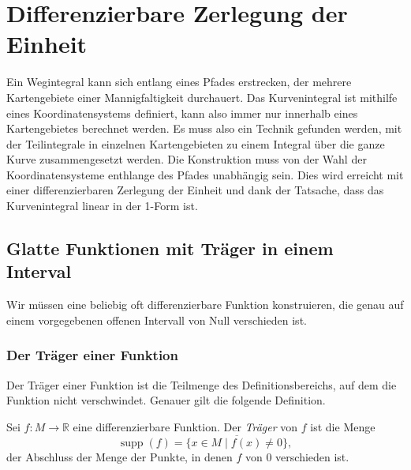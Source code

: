 %
%
\section{Differenzierbare Zerlegung der Einheit
\label{buch:kurvenintegral:section:zerlegung}}
%
Ein Wegintegral kann sich entlang eines Pfades erstrecken, der
mehrere Kartengebiete einer Mannigfaltigkeit durchauert.
Das Kurvenintegral ist mithilfe eines Koordinatensystems definiert,
kann also immer nur innerhalb eines Kartengebietes berechnet werden.
Es muss also ein Technik gefunden werden, mit der Teilintegrale in
einzelnen Kartengebieten zu einem Integral über die ganze Kurve
zusammengesetzt werden.
Die Konstruktion muss von der Wahl der Koordinatensysteme enthlange
des Pfades unabhängig sein.
Dies wird erreicht mit einer differenzierbaren Zerlegung der Einheit
und dank der Tatsache, dass das Kurvenintegral linear in der 1-Form
ist.

%
%
\subsection{Glatte Funktionen mit Träger in einem Interval}
Wir müssen eine beliebig oft differenzierbare Funktion konstruieren,
die genau auf einem vorgegebenen offenen Intervall von Null
verschieden ist.

%
%
\subsubsection{Der Träger einer Funktion}
Der Träger einer Funktion ist die Teilmenge des Definitionsbereichs,
auf dem die Funktion nicht verschwindet.
Genauer gilt die folgende Definition.

\begin{definition}
Sei $f\colon M\to\mathbb{R}$ eine differenzierbare Funktion.
Der \emph{Träger} von $f$ ist die Menge
%
%
\[
\operatorname{supp}(f)
=
\overline{
\{x\in M\mid f(x)\ne 0\}
},
\]
der Abschluss der Menge der Punkte, in denen $f$ von $0$ verschieden
ist.
\end{definition}

%
%
